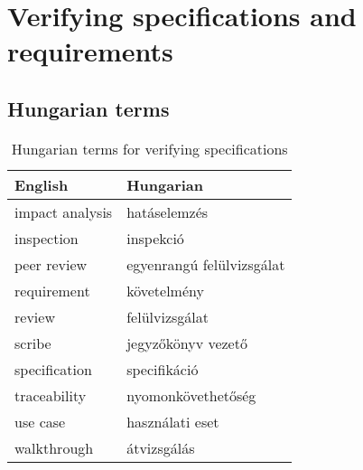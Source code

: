 \chapter{Verifying specifications and requirements}
\label{cha:specifications}



\section{Hungarian terms}

\begin{table}
    \centering
    \small
    \caption{Hungarian terms for verifying specifications}
    \begin{tabular}{ll}
        \toprule
        \textbf{English} & \textbf{Hungarian} \\
        \midrule
        impact analysis & hatáselemzés \\
        inspection & inspekció \\
        peer review & egyenrangú felülvizsgálat \\
        requirement & követelmény \\
        review & felülvizsgálat \\
        scribe & jegyzőkönyv vezető \\
        specification & specifikáció \\
        traceability & nyomonkövethetőség \\
        use case & használati eset \\
        walkthrough & átvizsgálás \\
        \bottomrule
        \end{tabular}
        \label{tab:overview:hungarian-terms-specifications}
        \end{table} 